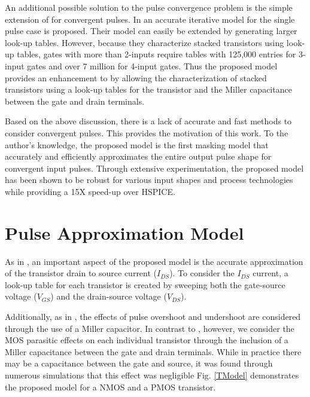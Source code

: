 An additional possible solution to the pulse convergence problem is the simple extension of \cite{Accurate_Masking} for convergent pulses. In \cite{Accurate_Masking} an accurate iterative model for the single pulse case is proposed. Their model can easily be extended by generating larger look-up tables. However, because they characterize stacked transistors using look-up tables, gates with more than 2-inputs require tables with 125,000 entries for 3-input gates and over 7 million for 4-input gates. Thus the proposed model provides an enhancement to \cite{Accurate_Masking} by allowing the characterization of stacked transistors using a look-up tables for the transistor and the Miller capacitance between the gate and drain terminals.

Based on the above discussion, there is a lack of accurate and fast methods to consider convergent pulses.  This provides the motivation of this work. To the author’s knowledge, the proposed model is the first masking model that accurately and efficiently approximates the entire output pulse shape for convergent input pulses. Through extensive experimentation, the proposed model has been shown to be robust for various input shapes and process technologies while providing a 15X speed-up over HSPICE.

\section{Pulse Approximation Model}
As in \cite{Accurate_Masking}, an important aspect of the proposed model is the accurate approximation of the transistor drain to source current ($I_{DS}$). To consider the $I_{DS}$ current, a look-up table for each transistor is created by sweeping both the gate-source voltage ($V_{GS}$) and the drain-source voltage ($V_{DS}$).
 
Additionally, as in \cite{Accurate_Masking}, the effects of pulse overshoot and undershoot are considered through the use of a Miller capacitor. In contrast to \cite{Accurate_Masking}, however, we consider the MOS parasitic effects on each individual transistor through the inclusion of a Miller capacitance between the gate and drain terminals. While in practice there may be a capacitance between the gate and source, it was found through numerous simulations that this effect was negligible Fig. \ref{TModel} demonstrates the proposed model for a NMOS and a PMOS transistor. 

